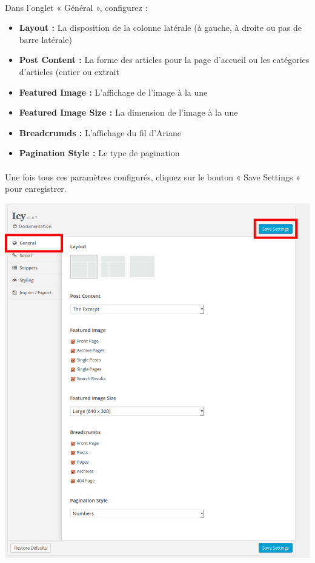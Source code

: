 \documentclass[10pt,a4paper]{article}
\begin{document}
\paragraph{}Dans l'onglet « Général », configurez :
\begin{itemize}
\item \textbf{Layout : }La disposition de la colonne latérale (à gauche, à droite ou pas de barre latérale)
\item \textbf{Post Content : }La forme des articles pour la page d'accueil ou les catégories d'articles (entier ou extrait
\item \textbf{Featured Image : }L'affichage de l'image à la une
\item \textbf{Featured Image Size : }La dimension de l'image à la une
\item \textbf{Breadcrumds : }L'affichage du fil d'Ariane
\item \textbf{Pagination Style : }Le type de pagination
\end{itemize}
\paragraph{}Une fois tous ces paramètres configurés, cliquez sur le bouton « Save Settings » pour enregistrer.
\begin{center}
\includegraphics[scale=0.3]{img/0247.png}
\end{center}
\end{document}
